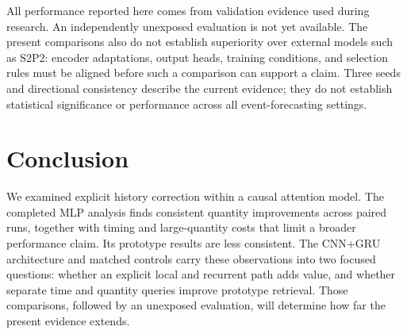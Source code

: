 \documentclass[runningheads]{llncs}
\begin{document}
All performance reported here comes from validation evidence used during research. An independently unexposed evaluation is not yet available. The present comparisons also do not establish superiority over external models such as S2P2: encoder adaptations, output heads, training conditions, and selection rules must be aligned before such a comparison can support a claim. Three seeds and directional consistency describe the current evidence; they do not establish statistical significance or performance across all event-forecasting settings.

\section{Conclusion}
We examined explicit history correction within a causal attention model. The completed MLP analysis finds consistent quantity improvements across paired runs, together with timing and large-quantity costs that limit a broader performance claim. Its prototype results are less consistent. The CNN+GRU architecture and matched controls carry these observations into two focused questions: whether an explicit local and recurrent path adds value, and whether separate time and quantity queries improve prototype retrieval. Those comparisons, followed by an unexposed evaluation, will determine how far the present evidence extends.
\end{document}
